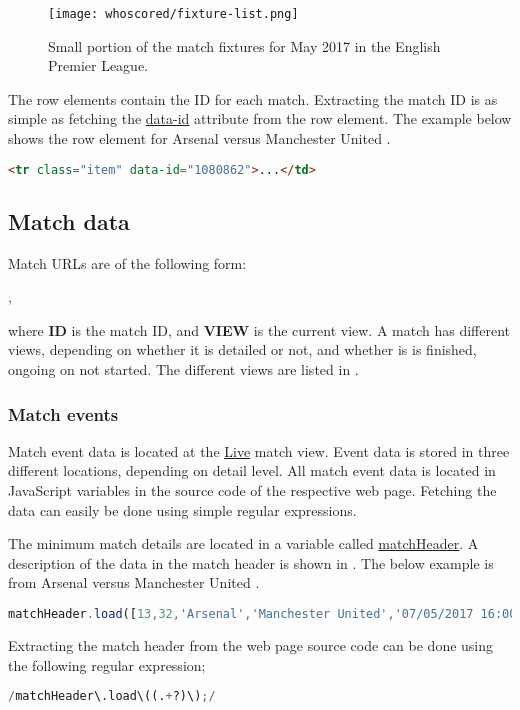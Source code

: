 \begin{figure}
    \centering
    \texttt{[image: whoscored/fixture-list.png]}
    \caption{Small portion of the match fixtures for May 2017 in the English Premier League.}
    \label{fig:whoscored-fixture-list}
\end{figure}

The row elements contain the ID for each match. Extracting the match ID is as simple as fetching the \url{data-id} attribute from the row element. The example below shows the row element for Arsenal versus Manchester United .
\begin{lstlisting}[language=HTML]
<tr class="item" data-id="1080862">...</td>
\end{lstlisting}


\subsection{Match data}

Match URLs are of the following form:

,

where \textbf{ID} is the match ID, and \textbf{VIEW} is the current view. A match has different views, depending on whether it is detailed or not, and whether is is finished, ongoing on not started. The different views are listed in .


\subsubsection{Match events}

Match event data is located at the \url{Live} match view. Event data is stored in three different locations, depending on detail level. All match event data is located in JavaScript variables in the source code of the respective web page. Fetching the data can easily be done using simple regular expressions.

The minimum match details are located in a variable called \url{matchHeader}. A description of the data in the match header is shown in . The below example is from Arsenal versus Manchester United .
\begin{lstlisting}[language=JavaScript]
matchHeader.load([13,32,'Arsenal','Manchester United','07/05/2017 16:00:00','07/05/2017 00:00:00',6,'FT','0 : 0','2 : 0',,,'2 : 0','England','England']);
\end{lstlisting}
Extracting the match header from the web page source code can be done using the following regular expression;
\begin{lstlisting}[language=Python]
    /matchHeader\.load\((.+?)\);/
\end{lstlisting}

